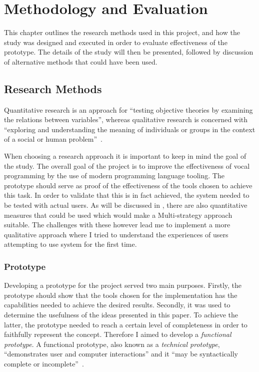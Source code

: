 \documentclass[../thesis.tex]{subfiles}
\begin{document}
\chapter{Methodology and Evaluation}\label{methodology_and_evaluation}
This chapter outlines the research methods used in this project,
and how the study was designed and executed in order to evaluate effectiveness of the prototype.
The details of the study will then be presented, followed by
discussion of alternative methods that could have been used.


\section{Research Methods}
Quantitative research is an approach for ``testing objective theories by examining the relations between variables'', whereas qualitative research is concerned with ``exploring and understanding the meaning of individuals or groups in the context of a social or human problem''~\parencite{creswell2018}.

When choosing a research approach it is important to keep in mind the goal of the study.
The overall goal of the project is to improve the effectiveness of vocal programming by the use of modern programming language tooling.
The prototype should serve as proof of the effectiveness of the tools chosen to achieve this task.
In order to validate that this is in fact achieved, the system needed to be tested with actual users.
As will be discussed in , there are also quantitative measures that could be used which would make a Multi-strategy approach suitable.
The challenges with these however lead me to implement a more qualitative approach where I tried to understand the experiences of users attempting to use system for the first time.



\subsection{Prototype}
Developing a prototype for the project served two main purposes.
Firstly, the prototype should show that the tools chosen for the implementation has the capabilities needed to achieve the desired results.
Secondly, it was used to determine the usefulness of the ideas presented in this paper.
To achieve the latter, the prototype needed to reach a certain level of completeness in order to faithfully represent the concept.
Therefore I aimed to develop a \textit{functional prototype}.
A functional prototype, also known as a \textit{technical prototype}, ``demonstrates user and computer interactions'' and it 
``may be syntactically complete or incomplete''~\parencite{jones2000rapid}.
\end{document}
